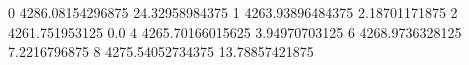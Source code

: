 0 4286.08154296875 24.32958984375
1 4263.93896484375 2.18701171875
2 4261.751953125 0.0
4 4265.70166015625 3.94970703125
6 4268.9736328125 7.2216796875
8 4275.54052734375 13.78857421875
